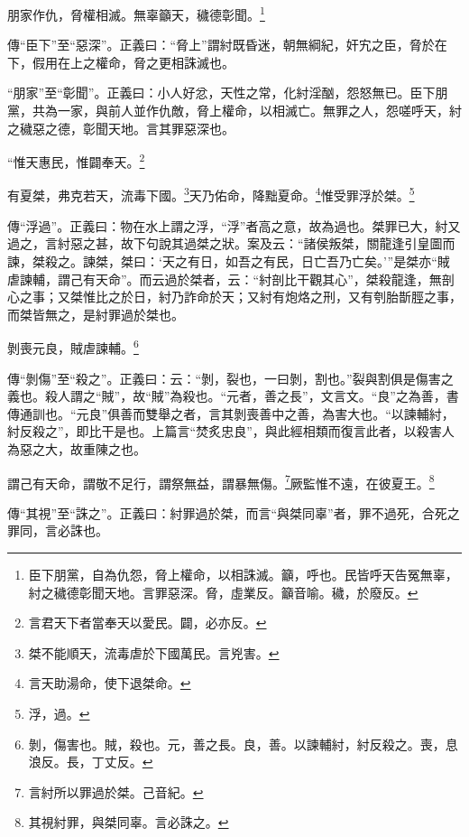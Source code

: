朋家作仇，脅權相滅。無辜籲天，穢德彰聞。\footnote{臣下朋黨，自為仇怨，脅上權命，以相誅滅。籲，呼也。民皆呼天告冤無辜，紂之穢德彰聞天地。言罪惡深。脅，虛業反。籲音喻。穢，於廢反。}

{\noindent\zhuan{}\fzbyks 傳“臣下”至“惡深”。正義曰：“脅上”謂紂既昏迷，朝無綱紀，奸宄之臣，脅於在下，假用在上之權命，脅之更相誅滅也。 \par}

{\noindent\shu{}\fzkt “朋家”至“彰聞”。正義曰：小人好忿，天性之常，化紂淫酗，怨怒無已。臣下朋黨，共為一家，與前人並作仇敵，脅上權命，以相滅亡。無罪之人，怨嗟呼天，紂之穢惡之德，彰聞天地。言其罪惡深也。 \par}

“惟天惠民，惟闢奉天。\footnote{言君天下者當奉天以愛民。闢，必亦反。}

有夏桀，弗克若天，流毒下國。\footnote{桀不能順天，流毒虐於下國萬民。言兇害。}天乃佑命，降黜夏命。\footnote{言天助湯命，使下退桀命。}惟受罪浮於桀。\footnote{浮，過。}

{\noindent\zhuan{}\fzbyks 傳“浮過”。正義曰：物在水上謂之浮，“浮”者高之意，故為過也。桀罪已大，紂又過之，言紂惡之甚，故下句說其過桀之狀。案及云：“諸侯叛桀，關龍逢引皇圖而諫，桀殺之。諫桀，桀曰：‘天之有日，如吾之有民，日亡吾乃亡矣。’”是桀亦“賊虐諫輔，謂己有天命”。而云過於桀者，云：“紂剖比干觀其心”，桀殺龍逢，無剖心之事；又桀惟比之於日，紂乃詐命於天；又紂有炮烙之刑，又有刳胎斮脛之事，而桀皆無之，是紂罪過於桀也。 \par}

剝喪元良，賊虐諫輔。\footnote{剝，傷害也。賊，殺也。元，善之長。良，善。以諫輔紂，紂反殺之。喪，息浪反。長，丁丈反。}

{\noindent\zhuan{}\fzbyks 傳“剝傷”至“殺之”。正義曰：云：“剝，裂也，一曰剝，割也。”裂與割俱是傷害之義也。殺人謂之“賊”，故“賊”為殺也。“元者，善之長”，文言文。“良”之為善，書傳通訓也。“元良”俱善而雙舉之者，言其剝喪善中之善，為害大也。“以諫輔紂，紂反殺之”，即比干是也。上篇言“焚炙忠良”，與此經相類而復言此者，以殺害人為惡之大，故重陳之也。 \par}

謂己有天命，謂敬不足行，謂祭無益，謂暴無傷。\footnote{言紂所以罪過於桀。己音紀。}厥監惟不遠，在彼夏王。\footnote{其視紂罪，與桀同辜。言必誅之。}

{\noindent\zhuan{}\fzbyks 傳“其視”至“誅之”。正義曰：紂罪過於桀，而言“與桀同辜”者，罪不過死，合死之罪同，言必誅也。 \par}

